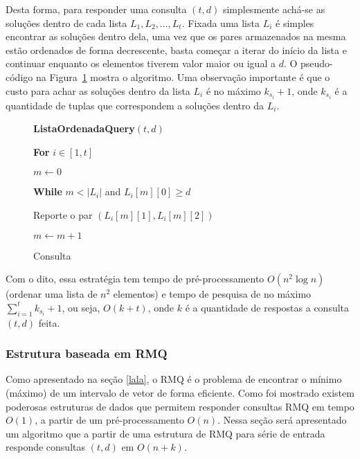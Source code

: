 \documentclass[12pt]{article}
\begin{document}
Desta forma, para responder uma consulta $(t, d)$ simplesmente achá-se as soluções
dentro de cada lista $L_1, L_2, \ldots, L_t$. Fixada uma lista $L_i$ é simples
encontrar as soluções dentro dela, uma vez que os pares armazenados na mesma
estão ordenados de forma decrescente, basta começar a iterar do início
da lista e continuar enquanto os elementos tiverem valor maior ou igual a	$d$.
O pseudo-código na Figura~\ref{fig:listaquery} mostra o algoritmo. Uma observação importante é 
que o custo para achar as soluções dentro da lista $L_i$ é no máximo $k_{s_i} + 1$,
 onde $k_{s_i}$ é a quantidade de tuplas que correspondem a soluções dentro da $L_i$. 

\bigskip
\begin{center}
\begin{figure}
\begin{framed}
{\bf ListaOrdenadaQuery}$(t, d)$

\hspace{1cm} {\bf For} $i \in [1, t]$

\hspace{2cm} $m \leftarrow 0$

\hspace{2cm} {\bf While} $m < |L_i|$ and $L_i[m][0] \ge d$

\hspace{3cm} Reporte o par $(L_i[m][1], L_i[m][2])$

\hspace{3cm} $m \leftarrow m + 1$
\caption{Consulta}
\label{fig:listaquery}
\end{framed}
\end{figure}
\end{center}

Com o dito, essa estratégia tem tempo de pré-processamento $O(n^2 \log n)$(ordenar uma lista de $n^2$ elementos) 
e tempo de pesquisa de no máximo $\sum_{i = 1}^{t} k_{s_i} + 1$, ou seja, $O(k + t)$,
onde $k$ é a quantidade de respostas a consulta $(t,d)$ feita.

\subsubsection{Estrutura baseada em RMQ}

Como apresentado na seção \ref{lala}, o RMQ é o problema de 
encontrar o mínimo (máximo) de um intervalo de vetor de forma 
eficiente. Como foi mostrado existem poderosas estruturas
de dados que permitem responder consultas RMQ em tempo $O(1)$, a partir de um pré-processamento $O(n)$. 
Nessa seção será apresentado um algoritmo que a partir de uma estrutura de RMQ para série
de entrada responde consultas $(t, d)$ em $O(n + k)$. 
\end{document}
